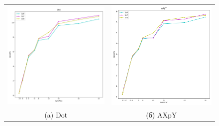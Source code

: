 \documentclass[12pt, a4paper]{article}
\begin{document}
\begin{figure}[H]
	\center
	\begin{tabular}{cc}
		\includegraphics[width=85mm]{mpi_polus_dot} & \includegraphics[width=85mm]{mpi_polus_axpy} \\
		(a) Dot & (б) AXpY \\

\end{tabular}
\end{figure}
\end{document}
